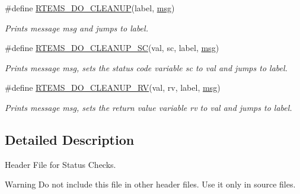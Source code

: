 \begin{Indent}
\begin{DoxyCompactItemize}
\#define \mbox{\hyperlink{group__rtems__status__checks_gac0cc57548f6a154c520e57a9b69637a3}{R\+T\+E\+M\+S\+\_\+\+D\+O\+\_\+\+C\+L\+E\+A\+N\+UP}}(label,  \mbox{\hyperlink{structmsg}{msg}})
\begin{DoxyCompactList}\small\item\em Prints message {\itshape msg} and jumps to {\itshape label}. \end{DoxyCompactList}\item 
\#define \mbox{\hyperlink{group__rtems__status__checks_ga5f74dc2ba6b31bc376dcfd33386ebf47}{R\+T\+E\+M\+S\+\_\+\+D\+O\+\_\+\+C\+L\+E\+A\+N\+U\+P\+\_\+\+SC}}(val,  sc,  label,  \mbox{\hyperlink{structmsg}{msg}})
\begin{DoxyCompactList}\small\item\em Prints message {\itshape msg}, sets the status code variable {\itshape sc} to {\itshape val} and jumps to {\itshape label}. \end{DoxyCompactList}\item 
\#define \mbox{\hyperlink{group__rtems__status__checks_ga73faf2a5b5c46ff8e3e061baec934002}{R\+T\+E\+M\+S\+\_\+\+D\+O\+\_\+\+C\+L\+E\+A\+N\+U\+P\+\_\+\+RV}}(val,  rv,  label,  \mbox{\hyperlink{structmsg}{msg}})
\begin{DoxyCompactList}\small\item\em Prints message {\itshape msg}, sets the return value variable {\itshape rv} to {\itshape val} and jumps to {\itshape label}. \end{DoxyCompactList}\end{DoxyCompactItemize}
\end{Indent}


\subsection{Detailed Description}
Header File for Status Checks. 

\begin{DoxyWarning}{Warning}
Do not include this file in other header files. Use it only in source files. 
\end{DoxyWarning}
